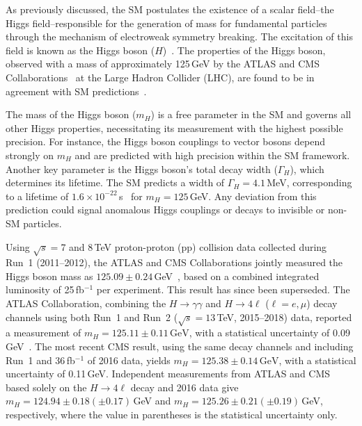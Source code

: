 As previously discussed, the SM postulates the existence of a scalar field--the Higgs field--responsible for the generation of mass for fundamental particles through the mechanism of electroweak symmetry breaking. The excitation of this field is known as the Higgs boson ($H$)~\cite{StandardModel67_1, Englert:1964et, Higgs:1964ia, Higgs:1964pj, Guralnik:1964eu, StandardModel67_2, StandardModel67_3}. The properties of the Higgs boson, observed with a mass of approximately 125\,GeV by the ATLAS and CMS Collaborations~\cite{Aad:2012tfa, Chatrchyan:2012xdj, Chatrchyan:2013lba} at the Large Hadron Collider (LHC), are found to be in agreement with SM predictions~\cite{ATLASnature, CMSnature}. 

The mass of the Higgs boson ($m_H$) is a free parameter in the SM and governs all other Higgs properties, necessitating its measurement with the highest possible precision. For instance, the Higgs boson couplings to vector bosons depend strongly on $m_H$ and are predicted with high precision within the SM framework. Another key parameter is the Higgs boson's total decay width ($\Gamma_H$), which determines its lifetime. The SM predicts a width of $\Gamma_H = 4.1$\,MeV, corresponding to a lifetime of $1.6 \times 10^{-22}$\,s~\cite{deFlorian:2016spz} for $m_H = 125$\,GeV. Any deviation from this prediction could signal anomalous Higgs couplings or decays to invisible or non-SM particles.

Using $\sqrt{s} = $7 and 8\,TeV proton-proton (pp) collision data collected during Run~1 (2011–2012), the ATLAS and CMS Collaborations jointly measured the Higgs boson mass as $125.09 \pm 0.24$\,GeV~\cite{Aad:2015zhl}, based on a combined integrated luminosity of 25\,fb$^{-1}$ per experiment. This result has since been superseded. The ATLAS Collaboration, combining the $H \to \gamma\gamma$ and $H \to 4\ell$ ($\ell = e, \mu$) decay channels using both Run~1 and Run~2 ($\sqrt{s} = 13$\,TeV, 2015–2018) data, reported a measurement of $m_H = 125.11 \pm 0.11\,\mathrm{GeV}$, with a statistical uncertainty of 0.09\,GeV~\cite{ATLAS_mass}. The most recent CMS result, using the same decay channels and including Run~1 and 36\,fb$^{-1}$ of 2016 data, yields $m_H = 125.38 \pm 0.14\,\mathrm{GeV}$, with a statistical uncertainty of 0.11\,GeV. Independent measurements from ATLAS and CMS based solely on the $H \to 4\ell$ decay and 2016 data give $m_H = 124.94 \pm 0.18 (\pm 0.17)$\,GeV and $m_H = 125.26 \pm 0.21 (\pm 0.19)$\,GeV, respectively, where the value in parentheses is the statistical uncertainty only.

